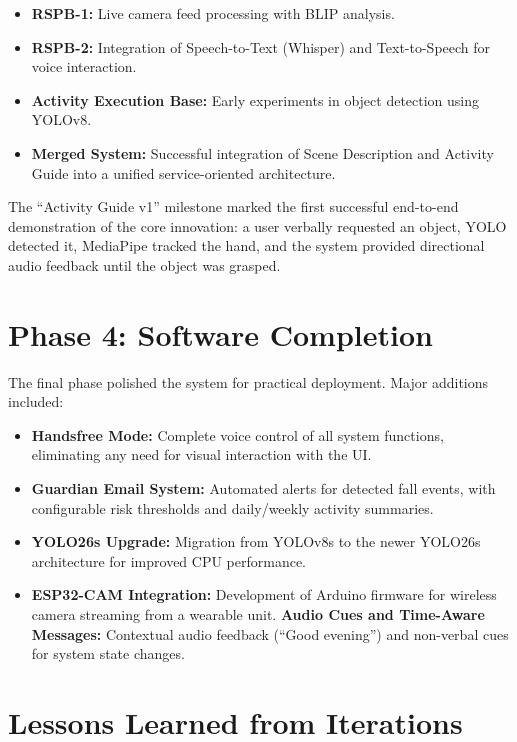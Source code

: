 \documentclass[12pt,a4paper]{report}
\begin{document}
\begin{itemize}
    \item \textbf{RSPB-1:} Live camera feed processing with BLIP analysis.
    \item \textbf{RSPB-2:} Integration of Speech-to-Text (Whisper) and Text-to-Speech for voice interaction.
    \item \textbf{Activity Execution Base:} Early experiments in object detection using YOLOv8.
    \item \textbf{Merged System:} Successful integration of Scene Description and Activity Guide into a unified service-oriented architecture.
\end{itemize}

The ``Activity Guide v1'' milestone marked the first successful end-to-end demonstration of the core innovation: a user verbally requested an object, YOLO detected it, MediaPipe tracked the hand, and the system provided directional audio feedback until the object was grasped.

\section{Phase 4: Software Completion}

The final phase polished the system for practical deployment. Major additions included:

\begin{itemize}
    \item \textbf{Handsfree Mode:} Complete voice control of all system functions, eliminating any need for visual interaction with the UI.
    \item \textbf{Guardian Email System:} Automated alerts for detected fall events, with configurable risk thresholds and daily/weekly activity summaries.
    \item \textbf{YOLO26s Upgrade:} Migration from YOLOv8s to the newer YOLO26s architecture for improved CPU performance.
    \item \textbf{ESP32-CAM Integration:} Development of Arduino firmware for wireless camera streaming from a wearable unit.
    \textbf{Audio Cues and Time-Aware Messages:} Contextual audio feedback (``Good evening'') and non-verbal cues for system state changes.
\end{itemize}

\section{Lessons Learned from Iterations}
\end{document}
